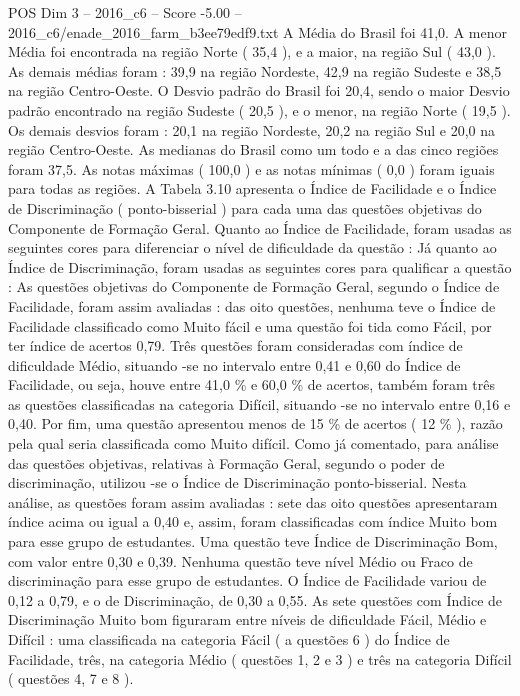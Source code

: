 \begin{textsample}{POS Dim 3 – 2016\_c6 – Score -5.00 – 2016\_c6/enade\_2016\_farm\_b3ee79edf9.txt}
A Média do Brasil foi 41,0.
A menor Média foi encontrada na região Norte ( 35,4 ), e a maior, na região Sul ( 43,0 ).
As demais médias foram : 39,9 na região Nordeste, 42,9 na região Sudeste e 38,5 na região Centro-Oeste.
O Desvio padrão do Brasil foi 20,4, sendo o maior Desvio padrão encontrado na região Sudeste ( 20,5 ), e o menor, na região Norte ( 19,5 ).
Os demais desvios foram : 20,1 na região Nordeste, 20,2 na região Sul e 20,0 na região Centro-Oeste.
As medianas do Brasil como um todo e a das cinco regiões foram 37,5.
As notas máximas ( 100,0 ) e as notas mínimas ( 0,0 ) foram iguais para todas as regiões.
A Tabela 3.10 apresenta o Índice de Facilidade e o Índice de Discriminação ( ponto-bisserial ) para cada uma das questões objetivas do Componente de Formação Geral.
Quanto ao Índice de Facilidade, foram usadas as seguintes cores para diferenciar o nível de dificuldade da questão : Já quanto ao Índice de Discriminação, foram usadas as seguintes cores para qualificar a questão : As questões objetivas do Componente de Formação Geral, segundo o Índice de Facilidade, foram assim avaliadas : das oito questões, nenhuma teve o Índice de Facilidade classificado como Muito fácil e uma questão foi tida como Fácil, por ter índice de acertos 0,79.
Três questões foram consideradas com índice de dificuldade Médio, situando -se no intervalo entre 0,41 e 0,60 do Índice de Facilidade, ou seja, houve entre 41,0 \% e 60,0 \% de acertos, também foram três as questões classificadas na categoria Difícil, situando -se no intervalo entre 0,16 e 0,40.
Por fim, uma questão apresentou menos de 15 \% de acertos ( 12 \% ), razão pela qual seria classificada como Muito difícil.
Como já comentado, para análise das questões objetivas, relativas à Formação Geral, segundo o poder de discriminação, utilizou -se o Índice de Discriminação ponto-bisserial.
Nesta análise, as questões foram assim avaliadas : sete das oito questões apresentaram índice acima ou igual a 0,40 e, assim, foram classificadas com índice Muito bom para esse grupo de estudantes.
Uma questão teve Índice de Discriminação Bom, com valor entre 0,30 e 0,39.
Nenhuma questão teve nível Médio ou Fraco de discriminação para esse grupo de estudantes.
O Índice de Facilidade variou de 0,12 a 0,79, e o de Discriminação, de 0,30 a 0,55.
As sete questões com Índice de Discriminação Muito bom figuraram entre níveis de dificuldade Fácil, Médio e Difícil : uma classificada na categoria Fácil ( a questões 6 ) do Índice de Facilidade, três, na categoria Médio ( questões 1, 2 e 3 ) e três na categoria Difícil ( questões 4, 7 e 8 ).

\end{textsample}
